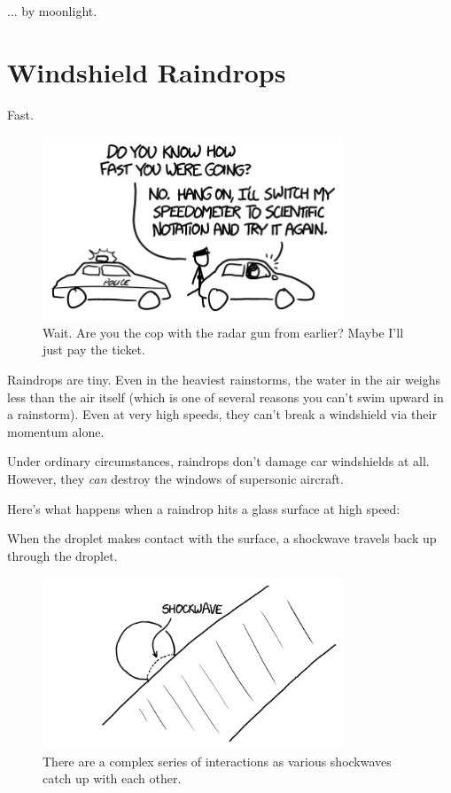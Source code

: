 {{... by moonlight.}

{
\chapter{Windshield Raindrops}
}

\hfill{}

{Fast.}

\begin{figure}[!htbp]
\centering
\includegraphics[scale=0.5, max width=0.8\textwidth]{imgs/a/93/rain_speed.png}
\caption{Wait. Are you the cop with the radar gun from earlier? Maybe I'll just pay the ticket.}
\end{figure}

{Raindrops are tiny. Even in the heaviest rainstorms, the water in the air weighs less than the air itself (which is one of several reasons you can't swim upward in a rainstorm). Even at very high speeds, they can't break a windshield via their momentum alone.}

{Under ordinary circumstances, raindrops don't damage car windshields at all. However, they \emph{can} destroy the windows of supersonic aircraft.}

{Here's what happens when a raindrop hits a glass surface at high speed:}

{When the droplet makes contact with the surface, a shockwave travels back up through the droplet.}

\begin{figure}[!htbp]
\centering
\includegraphics[scale=0.5, max width=0.8\textwidth]{imgs/a/93/rain_shock.png}
\caption{There are a complex series of interactions as various shockwaves catch up with each other.}
\end{figure}

}
